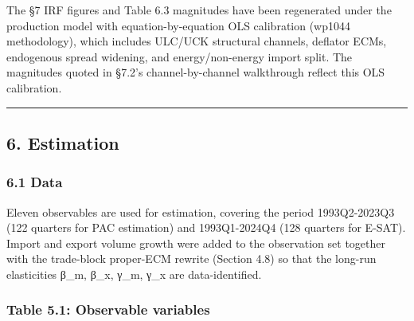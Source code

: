 \documentclass[
]{article}
\begin{document}
The §7 IRF figures and Table 6.3 magnitudes have been regenerated under
the production model with equation-by-equation OLS calibration (wp1044
methodology), which includes ULC/UCK structural channels, deflator ECMs,
endogenous spread widening, and energy/non-energy import split. The
magnitudes quoted in §7.2's channel-by-channel walkthrough reflect this
OLS calibration.

\begin{center}\rule{0.5\linewidth}{0.5pt}\end{center}

\subsection{6. Estimation}\label{estimation}

\subsubsection{6.1 Data}\label{data}

Eleven observables are used for estimation, covering the period
1993Q2-2023Q3 (122 quarters for PAC estimation) and 1993Q1-2024Q4 (128
quarters for E-SAT). Import and export volume growth were added to the
observation set together with the trade-block proper-ECM rewrite
(Section 4.8) so that the long-run elasticities β\_m, β\_x, γ\_m, γ\_x
are data-identified.

\subsubsection{Table 5.1: Observable
variables}\label{table-5.1-observable-variables}
\end{document}
